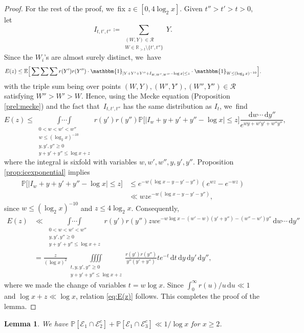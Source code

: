 \documentclass[10pt,a4paper]{amsart}
\newcommand{\RR}{\mathbb{R}}
\newcommand{\PP}{\mathbb{P}}
\newcommand{\EE}{\mathbb{E}}
\newcommand{\dee}{\,\mathrm{d}}
\newcommand{\one}{\mathbbm{1}}
\newcommand{\EC}{\mathcal{E}}
\newcommand{\RS}{\mathscr{R}}
\newcommand{\bg}{\big}
\newcommand{\bgg}{\Big}
\theoremstyle{plain}
\newtheorem{lem}[cor]{Lemma}
\theoremstyle{definition}
\begin{document}
\begin{proof}
For the rest of the proof, we~fix $z\in[0,4\log_2x]$.
Given $t''>t'>t > 0$, let
\[
I_{t,t',t''}\coloneqq \sum_{\substack{(W,Y)\in\RS\\ W\in\RR_{>t}\setminus\{t',t''\}}} Y.
\]
Since the $W_i$'s are almost surely distinct, we~have
\begin{align*}
E(z) \le \EE\bgg[ \mathop{\sum\sum\sum}
r(Y')r(Y'') \cdot \one_{|Y+Y'+Y''+I_{W,W',W''}-\log x|\le z} \cdot \one_{W \le (\log_2x)^{-10}} \bgg].
\end{align*}
with the triple sum being over points $(W,Y),(W',Y'),(W'',Y'')\in\RS$ satisfying \hbox{$W''>W'>W$}. Hence, using the Mecke equation (Proposition \ref{prel:mecke}) and the fact that~$I_{t, t', t''}$ has the same distribution as $I_{t}$, we~find
\[
E(z) \le \mathop{\int\cdots\int}\limits_{\substack{0<w<w'<w'' \\ w\le (\log_2x)^{-10} \\ y,y',y''\ge0 \\ y+y'+y''\le \log x+z }} r(y')r(y'')
\PP\bgg[ \bg|I_w+y+y'+y''-\log x\bg|\le z\bgg]
\frac{\dee w\cdots \dee y''}{ e^{wy+w'y'+w''y''}},
\]
where the integral is sixfold with variables $w,w',w'',y,y',y''$. Proposition \ref{prop:icexponential} implies
\begin{align*}
\PP\bgg[ \bg|I_w+y+y'+y''-\log x\bg|\le z\bgg] &\le e^{-w(\log x-y-y'-y'')} (e^{wz}-e^{-wz}) \\
&\ll wz e^{-w(\log x-y-y'-y'')},
\end{align*}
since $w\le(\log_2x)^{-10}$ and $z\le 4\log_2x$. Consequently,
\[
\begin{split}
E(z) &\ll
\mathop{\int\cdots\int}\limits_{\substack{0<w<w'<w'' \\ y,y',y''\ge0 \\ y+y'+y''\le \log x+z }} r(y')r(y'')
zwe^{-w\log x-(w'-w)(y'+y'')-(w''-w')y''}\dee w\cdots \dee y'' \\
&= \frac{z}{(\log x)^2} \iiiint\limits_{\substack{t,y,y',y''\ge 0 \\ y+y'+y''\le \log x+z }} \frac{r(y')r(y'')}{y''(y'+y'')}
t e^{-t} \dee t\dee y\dee y'\dee y'',
\end{split}
\]
where we made the change of variables $t=w\log x$. Since $\int_0^\infty r(u)/u \dee u\ll 1$ and $\log x+z\ll\log x$, relation \eqref{eq:E(z)} follows. This completes the proof of the lemma.
\end{proof}

\begin{lem}
\label{lem:prob e2c e3c}
We have $\PP[\EC_1 \cap \EC_2^c] + \PP[\EC_1 \cap \EC_3^c] \ll 1/\log x$ for $x\ge2$.
\end{lem}
\end{document}
